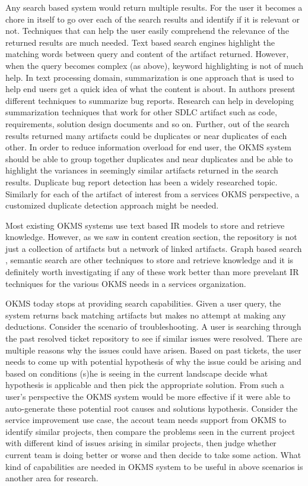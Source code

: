 Any search based system would return multiple results. For the user it becomes a chore in itself to go over each of the search results and identify if it is relevant or not. Techniques that can help the user easily comprehend the relevance of the returned results are much needed. Text based search engines highlight the matching words between query and content of the artifact returned. However, when the query becomes complex (as above), keyword highlighting is not of much help. In text processing domain, summarization is one approach that is used to help end users get a quick idea of what the content is about. In \cite{} authors present different techniques to summarize bug reports. Research can help in developing summarization techniques that work for other SDLC artifact such as code, requirements, solution design documents and so on. Further, out of the search results returned many artifacts could be duplicates or near duplicates of each other. In order to reduce information overload for end user, the OKMS system should be able to group together duplicates and near duplicates and be able to highlight the variances in seemingly similar artifacts returned in the search results. Duplicate bug report detection \cite{} has been a widely researched topic. Similarly for each of the artifact of interest from a services OKMS perspective, a customized duplicate detection approach might be needed. 

Most existing OKMS systems use text based IR models to store and retrieve knowledge. However, as we saw in content creation section, the repository is not just a collection of artifacts but a network of linked artifacts. Graph based search \cite{}, semantic search \cite{} are other techniques to store and retrieve knowledge and it is definitely worth investigating if any of these work better than more prevelant IR techniques for the various OKMS needs in a services organization. 

OKMS today stops at providing search capabilities. Given a user query, the system returns back matching artifacts but makes no attempt at making any deductions. Consider the scenario of troubleshooting. A user is searching through the past resolved ticket repository to see if similar issues were resolved. There are multiple reasons why the issues could have arisen. Based on past tickets, the user needs to come up with potential hypothesis of why the issue could be arising and based on conditions (s)he is seeing in the current landscape decide what hypothesis is applicable and then pick the appropriate solution. From such a user's perspective the OKMS system would be more effective if it were able to auto-generate these potential root causes and solutions hypothesis. Consider the service improvement use case, the accout team needs support from OKMS to identify similar projects, then compare the problems seen in the current project with different kind of issues arising in similar projects, then judge whether current team is doing better or worse and then decide to take some action. What kind of capabilities are needed in OKMS system to be useful in above scenarios is another area for research. 

